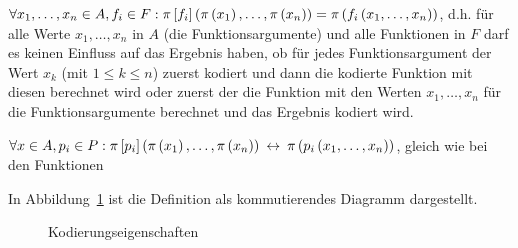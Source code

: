 \begin{defn}[Kodierungseigenschaften] \quad
\begin{\whichitem}
\item $\text{$\forall$} x_1,\ldots,x_n \in A, f_i \in F: \pi\left[f_i\right]\left(\pi\left(x_1\right),\ldots,\pi\left(x_n\right)\right) = \pi\left(f_i\left(x_1,\ldots,x_n\right)\right)$, d.h.
für alle Werte $x_1,\ldots,x_n$ in $A$ (die Funktionsargumente) und alle Funktionen in $F$ darf es keinen Einfluss auf das Ergebnis haben,
ob für jedes Funktionsargument der Wert $x_k$ (mit $1 \leq k \leq n$) zuerst kodiert und dann die kodierte Funktion mit diesen berechnet wird
oder zuerst der die Funktion mit den Werten $x_1,\ldots,x_n$ für die Funktionsargumente berechnet und das Ergebnis kodiert wird.
\item $\text{$\forall$} x \in A, p_i \in P: \pi\left[p_i\right]\left(\pi\left(x_1\right),\ldots,\pi\left(x_n\right)\right) \:\leftrightarrow\: \pi\left(p_i\left(x_1,\ldots,x_n\right)\right)$, gleich wie bei den Funktionen
\end{\whichitem}
\end{defn}

In Abbildung~\ref{Kodierungseigenschaften} ist die Definition als kommutierendes Diagramm dargestellt.
\begin{figure}[h!t]
\begin{center}
\end{center}
 \caption{Kodierungseigenschaften}
 \label{Kodierungseigenschaften}
\end{figure}

